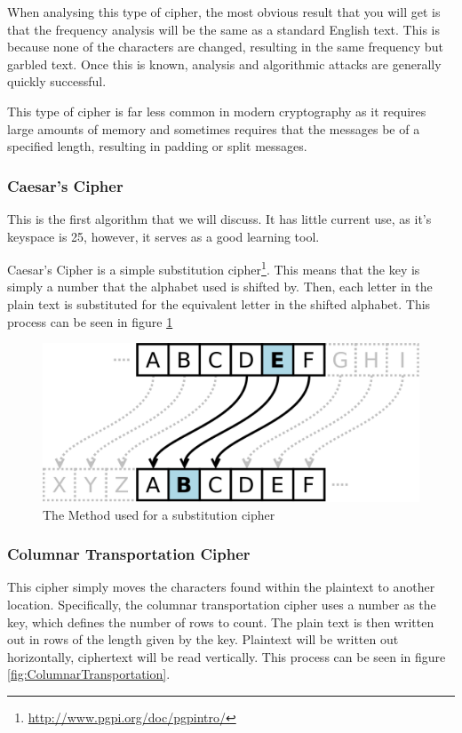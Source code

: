 				When analysing this type of cipher, the most obvious result that you will get is that the frequency analysis will be the same as a standard English text. 
				This is because none of the characters are changed, resulting in the same frequency but garbled text. 
				Once this is known, analysis and algorithmic attacks are generally quickly successful. 

				This type of cipher is far less common in modern cryptography as it requires large amounts of memory
				and sometimes requires that the messages be of a specified length, resulting in padding or split messages. 
			\subsubsection{Caesar's Cipher}
				This is the first algorithm that we will discuss. 
				It has little current use, as it's keyspace is 25, however, it serves as a good learning tool. 

				Caesar's Cipher is a simple substitution cipher\footnote{\url{http://www.pgpi.org/doc/pgpintro/}}. 
				This means that the key is simply a number that the alphabet used is shifted by. 
				Then, each letter in the plain text is substituted for the equivalent letter in the shifted alphabet. 
				This process can be seen in figure \ref{fig:CaesarsCipher}
				\begin{figure}[htb]
					\centering
					\includegraphics[scale=0.25]{./CaesarsCipher.png}
					\caption{The Method used for a substitution cipher}
					\label{fig:CaesarsCipher}
				\end{figure}
			\subsubsection{Columnar Transportation Cipher}
				This cipher simply moves the characters found within the plaintext to another location. 
				Specifically, the columnar transportation cipher uses a number as the key, which defines the number of rows to count.
				The plain text is then written out in rows of the length given by the key. 
				Plaintext will be written out horizontally, ciphertext will be read vertically. 
				This process can be seen in figure \ref{fig:ColumnarTransportation}.

